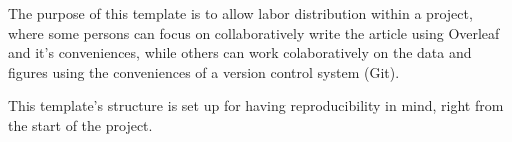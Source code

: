 The purpose of this template is to allow labor distribution within a project, where some persons can focus on collaboratively write the article using Overleaf and it's conveniences, while others can work colaboratively on the data and figures using the conveniences of a version control system (Git). 

This template's structure is set up for having reproducibility in mind, right from the start of the project.

\textcolor{gray}{\lipsum[1-2]}